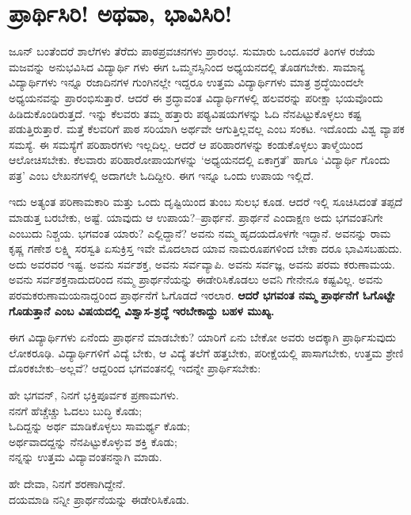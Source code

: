
\chapter{ಪ್ರಾರ್ಥಿಸಿರಿ! ಅಥವಾ, ಭಾವಿಸಿರಿ!}

ಜೂನ್ ಬಂತೆಂದರೆ ಶಾಲೆಗಳು ತೆರೆದು ಪಾಠಪ್ರವಚನಗಳು ಪ್ರಾರಂಭ. ಸುಮಾರು ಒಂದೂವರೆ ತಿಂಗಳ ರಜೆಯ ಮಜವನ್ನು ಅನುಭವಿಸಿದ ವಿದ್ಯಾರ್ಥಿ ಗಳು ಈಗ ಒಮ್ಮನಸ್ಸಿನಿಂದ ಅಧ್ಯಯನದಲ್ಲಿ ತೊಡಗಬೇಕು. ಸಾಮಾನ್ಯ ವಿದ್ಯಾರ್ಥಿಗಳು ಇನ್ನೂ ರಜಾದಿನಗಳ ಗುಂಗಿನಲ್ಲೇ ಇದ್ದರೂ ಉತ್ತಮ ವಿದ್ಯಾರ್ಥಿಗಳು ಮಾತ್ರ ಶ್ರದ್ಧೆಯಿಂದಲೇ ಅಧ್ಯಯನವನ್ನು ಪ್ರಾರಂಭಿಸುತ್ತಾರೆ. ಆದರೆ ಈ ಶ್ರದ್ಧಾವಂತ ವಿದ್ಯಾರ್ಥಿಗಳಲ್ಲಿ ಹಲವರನ್ನು ಪರೀಕ್ಷಾ ಭಯವೊಂದು ಹಿಡಿದುಕೊಂಡಿರುತ್ತದೆ. ಇನ್ನು ಕೆಲವರು ತಮ್ಮ ಹತ್ತಾರು ಪಠ್ಯವಿಷಯಗಳನ್ನು ಓದಿ ನೆನಪಿಟ್ಟುಕೊಳ್ಳಲು ಕಷ್ಟ ಪಡುತ್ತಿರುತ್ತಾರೆ. ಮತ್ತೆ ಕೆಲವರಿಗೆ ಪಾಠ ಸರಿಯಾಗಿ ಅರ್ಥವೇ ಆಗುತ್ತಿಲ್ಲವಲ್ಲ ಎಂಬ ಸಂಕಟ. ಇದೊಂದು ವಿಶ್ವ ವ್ಯಾಪಕ ಸಮಸ್ಯೆ. ಈ ಸಮಸ್ಯೆಗೆ ಪರಿಹಾರಗಳು ಇಲ್ಲದಿಲ್ಲ. ಆದರೆ ಆ ಪರಿಹಾರಗಳನ್ನು ಕಂಡುಕೊಳ್ಳಲು ತಾಳ್ಮೆಯಿಂದ ಆಲೋಚಿಸಬೇಕು. ಕೆಲವಾರು ಪರಿಹಾರೋಪಾಯಗಳನ್ನು ‘ಅಧ್ಯಯನದಲ್ಲಿ ಏಕಾಗ್ರತೆ’ ಹಾಗೂ ‘ವಿದ್ಯಾರ್ಥಿ ಗೊಂದು ಪತ್ರ’ ಎಂಬ ಲೇಖನಗಳಲ್ಲಿ ಅದಾಗಲೇ ಓದಿದ್ದೀರಿ. ಈಗ ಇನ್ನೂ ಒಂದು ಉಪಾಯ ಇಲ್ಲಿದೆ.

ಇದು ಅತ್ಯಂತ ಪರಿಣಾಮಕಾರಿ ಮತ್ತು ಒಂದು ದೃಷ್ಟಿಯಿಂದ ತುಂಬ ಸುಲಭ ಕೂಡ. ಆದರೆ ಇಲ್ಲಿ ಸೂಚಿಸಿದಂತೆ ತಪ್ಪದೆ ಮಾಡುತ್ತ ಬರಬೇಕು, ಅಷ್ಟೆ. ಯಾವುದು ಆ ಉಪಾಯ?–ಪ್ರಾರ್ಥನೆ. ಪ್ರಾರ್ಥನೆ ಎಂದಾಕ್ಷಣ ಅದು ಭಗವಂತನಿಗೇ ಎಂಬುದು ನಿಶ್ಚಯ. ಭಗವಂತ ಯಾರು? ಎಲ್ಲಿದ್ದಾನೆ? ಅವನು ನಮ್ಮ ಹೃದಯದೊಳಗೇ ಇದ್ದಾನೆ. ಅವನನ್ನು ರಾಮ ಕೃಷ್ಣ ಗಣೇಶ ಲಕ್ಷ್ಮಿ ಸರಸ್ವತಿ ಏಸುಕ್ರಿಸ್ತ ಇವೇ ಮೊದಲಾದ ಯಾವ ನಾಮರೂಪಗಳಿಂದ ಬೇಕಾ ದರೂ ಭಾವಿಸಬಹುದು. ಅದು ಅವರವರ ಇಷ್ಟ. ಅವನು ಸರ್ವಶಕ್ತ, ಅವನು ಸರ್ವವ್ಯಾಪಿ. ಅವನು ಸರ್ವಜ್ಞ, ಅವನು ಪರಮ ಕರುಣಾಮಯ. ಅವನು ಸರ್ವಶಕ್ತನಾದುದರಿಂದ ನಮ್ಮ ಪ್ರಾರ್ಥನೆಯನ್ನು ಈಡೇರಿಸಿಕೊಡಲು ಅವನಿ ಗೇನೇನೂ ಕಷ್ಟವಿಲ್ಲ. ಅವನು ಪರಮಕರುಣಾಮಯನಾದ್ದರಿಂದ ಪ್ರಾರ್ಥನೆಗೆ ಓಗೊಡದೆ ಇರಲಾರ. \textbf{ಆದರೆ ಭಗವಂತ ನಮ್ಮ ಪ್ರಾರ್ಥನೆಗೆ ಓಗೊಟ್ಟೇ ಗೊಡುತ್ತಾನೆ ಎಂಬ ವಿಷಯದಲ್ಲಿ ವಿಶ್ವಾಸ-ಶ್ರದ್ಧೆ ಇರಬೇಕಾದ್ದು ಬಹಳ ಮುಖ್ಯ.}

ಈಗ ವಿದ್ಯಾರ್ಥಿಗಳು ಏನೆಂದು ಪ್ರಾರ್ಥನೆ ಮಾಡಬೇಕು? ಯಾರಿಗೆ ಏನು ಬೇಕೋ ಅವರು ಅದಕ್ಕಾಗಿ ಪ್ರಾರ್ಥಿಸುವುದು ಲೋಕರೂಢಿ. ವಿದ್ಯಾರ್ಥಿಗಳಿಗೆ ವಿದ್ಯೆ ಬೇಕು, ಆ ವಿದ್ಯೆ ತಲೆಗೆ ಹತ್ತಬೇಕು, ಪರೀಕ್ಷೆಯಲ್ಲಿ ಪಾಸಾಗಬೇಕು, ಉತ್ತಮ ಶ್ರೇಣಿ ದೊರಕಬೇಕು–ಅಲ್ಲವೆ? ಆದ್ದರಿಂದ ಭಗವಂತನಲ್ಲಿ ಇದನ್ನೇ ಪ್ರಾರ್ಥಿಸಬೇಕು:

\begin{myquote}
ಹೇ ಭಗವನ್, ನಿನಗೆ ಭಕ್ತಿಪೂರ್ವಕ ಪ್ರಣಾಮಗಳು.\\
 ನನಗೆ ಹೆಚ್ಚೆಚ್ಚು ಓದಲು ಬುದ್ಧಿ ಕೊಡು;\\
 ಓದಿದ್ದನ್ನು ಅರ್ಥ ಮಾಡಿಕೊಳ್ಳಲು ಸಾಮರ್ಥ್ಯ ಕೊಡು;\\
 ಅರ್ಥವಾದದ್ದನ್ನು ನೆನಪಿಟ್ಟುಕೊಳ್ಳುವ ಶಕ್ತಿ ಕೊಡು;\\
 ನನ್ನನ್ನು ಉತ್ತಮ ವಿದ್ಯಾವಂತನನ್ನಾಗಿ ಮಾಡು.
\end{myquote}

\begin{myquote}
ಹೇ ದೇವಾ, ನಿನಗೆ ಶರಣಾಗಿದ್ದೇನೆ.\\
 ದಯಮಾಡಿ ನನ್ನೀ ಪ್ರಾರ್ಥನೆಯನ್ನು ಈಡೇರಿಸಿಕೊಡು.
\end{myquote}

